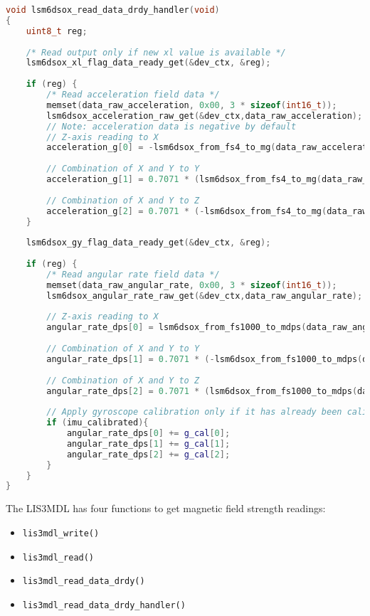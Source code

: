 \documentclass[11pt]{ucthesisCP}
\begin{document}
\begin{lstlisting}[language=C++]
void lsm6dsox_read_data_drdy_handler(void)
{
	uint8_t reg;
	
	/* Read output only if new xl value is available */
	lsm6dsox_xl_flag_data_ready_get(&dev_ctx, &reg);
	
	if (reg) {
		/* Read acceleration field data */
		memset(data_raw_acceleration, 0x00, 3 * sizeof(int16_t));
		lsm6dsox_acceleration_raw_get(&dev_ctx,data_raw_acceleration); 
		// Note: acceleration data is negative by default
		// Z-axis reading to X
		acceleration_g[0] = -lsm6dsox_from_fs4_to_mg(data_raw_acceleration[2]) / 1000.0; 
		
		// Combination of X and Y to Y
		acceleration_g[1] = 0.7071 * (lsm6dsox_from_fs4_to_mg(data_raw_acceleration[0]) / 1000.0 + lsm6dsox_from_fs4_to_mg(data_raw_acceleration[1]) / 1000.0);    
		
		// Combination of X and Y to Z
		acceleration_g[2] = 0.7071 * (-lsm6dsox_from_fs4_to_mg(data_raw_acceleration[0]) / 1000.0 + lsm6dsox_from_fs4_to_mg(data_raw_acceleration[1]) / 1000.0);   
	}
	
	lsm6dsox_gy_flag_data_ready_get(&dev_ctx, &reg);
	
	if (reg) {
		/* Read angular rate field data */
		memset(data_raw_angular_rate, 0x00, 3 * sizeof(int16_t));
		lsm6dsox_angular_rate_raw_get(&dev_ctx,data_raw_angular_rate);
		
		// Z-axis reading to X
		angular_rate_dps[0] = lsm6dsox_from_fs1000_to_mdps(data_raw_angular_rate[2]) / 1000.0;
		
		// Combination of X and Y to Y          
		angular_rate_dps[1] = 0.7071 * (-lsm6dsox_from_fs1000_to_mdps(data_raw_angular_rate[0]) / 1000.0 - lsm6dsox_from_fs1000_to_mdps(data_raw_angular_rate[1]) / 1000.0);
		
		// Combination of X and Y to Z
		angular_rate_dps[2] = 0.7071 * (lsm6dsox_from_fs1000_to_mdps(data_raw_angular_rate[0]) / 1000.0 - lsm6dsox_from_fs1000_to_mdps(data_raw_angular_rate[1]) / 1000.0);
		
		// Apply gyroscope calibration only if it has already been calibrated
		if (imu_calibrated){
			angular_rate_dps[0] += g_cal[0];
			angular_rate_dps[1] += g_cal[1];
			angular_rate_dps[2] += g_cal[2];
		}
	}
}
\end{lstlisting}

The LIS3MDL has four functions to get magnetic field strength readings:
\begin{itemize}[noitemsep,topsep=0pt,]
	\item \verb|lis3mdl_write()|
	\item \verb|lis3mdl_read()|
	\item \verb|lis3mdl_read_data_drdy()|
	\item \verb|lis3mdl_read_data_drdy_handler()|
\end{itemize}
\end{document}
